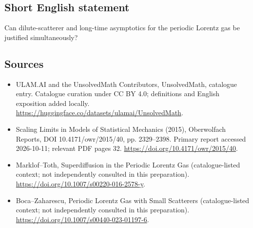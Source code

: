\documentclass[11pt]{article}
\begin{document}
\subsection{Short English statement}
Can dilute-scatterer and long-time asymptotics for the periodic Lorentz gas be justified simultaneously?
\subsection{Sources}
\begin{itemize}
\item[\hypertarget{source:statement:1}{S1}] ULAM.AI and the UnsolvedMath Contributors, UnsolvedMath, catalogue entry. Catalogue curation under CC BY 4.0; definitions and English exposition added locally.
\url{https://huggingface.co/datasets/ulamai/UnsolvedMath}.
\item[\hypertarget{source:statement:2}{S2}] Scaling Limits in Models of Statistical Mechanics (2015), Oberwolfach Reports, DOI 10.4171/owr/2015/40, pp. 2329--2398. Primary report accessed 2026-10-11; relevant PDF pages 32.
\url{https://doi.org/10.4171/owr/2015/40}.
\item[\hypertarget{source:statement:3}{S3}] Marklof--Toth, Superdiffusion in the Periodic Lorentz Gas (catalogue-listed context; not independently consulted in this preparation).
\url{https://doi.org/10.1007/s00220-016-2578-y}.
\item[\hypertarget{source:statement:4}{S4}] Boca--Zaharescu, Periodic Lorentz Gas with Small Scatterers (catalogue-listed context; not independently consulted in this preparation).
\url{https://doi.org/10.1007/s00440-023-01197-6}.
\end{itemize}
\label{end:statement}
\end{document}
